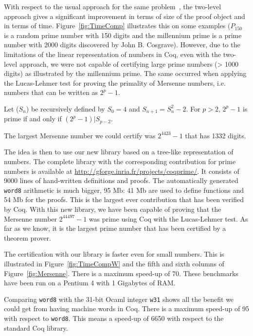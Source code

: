 With respect to the usual approach for the same 
problem~\cite{Caprotti_Oostdijk:01pockjsc}, the two-level
approach gives a significant improvement in terms of size of the
proof object and in terms of time.  
Figure~\ref{fig:TimeComp} illustrates this on some examples 
($P_{150}$ is a random prime number with 150 digits and the millennium prime is
a prime number with 2000 digits discovered by John B. Cosgrave).
However, due to the limitations of the linear representation of numbers in {\sc Coq},
even with the two-level approach, we were not capable of certifying large prime numbers 
(> 1000 digits) as illustrated by the millennium prime.
The same occurred when applying the Lucas-Lehmer test
for proving the primality of Mersenne numbers, 
i.e. numbers that can be written as $2 ^ p -1$.
\begin{theorem}\label{lucas}
Let ($S_n$) be recursively defined by $S_0= 4$ and $S_{n+1} = S_n^2 - 2$.
For $p > 2$, $2^p-1$ is prime if and only if $(2^p -1) | S_{p-2}$.
\end{theorem}
The largest Mersenne number we could certify was $2^{4423} - 1$ that has 1332 digits. 

The idea is then to use our new library based on a tree-like representation of numbers.
The complete library with the corresponding contribution for prime numbers 
is available at \url{http://gforge.inria.fr/projects/coqprime/}. 
It consists of 9000 lines of hand-written definitions and proofs. 
The automatically generated {\tt word8} arithmetic is much bigger,
95 Mb: 41 Mb are used to define functions and 54 Mb for the proofs. 
This is the largest ever contribution that has been verified by {\sc Coq}. 
With this new library, we have been capable of proving that the Mersenne number
$2^{44497} - 1$ was prime using {\sc Coq} with the Lucas-Lehmer test. 
As far as we know, it is the largest prime number  that has been certified 
by a theorem prover.

The certification with our library is faster even for  small numbers. 
This is illustrated in Figure~\ref{fig:TimeCompW} and the fifth and sixth  
columns of Figure~\ref{fig:Mersenne}. There is a maximum speed-up of 70. 
These benchmarks have been run on a Pentium 4 with 1 Gigabytes of RAM.

Comparing {\tt word8} with the 31-bit {\sc Ocaml} integer {\tt w31} shows 
all the benefit we could get from having machine words in {\sc Coq}. 
There is a maximum speed-up of 95 with respect to {\tt word8}. This
means a speed-up of 6650 with respect to the standard {\sc Coq} library.

